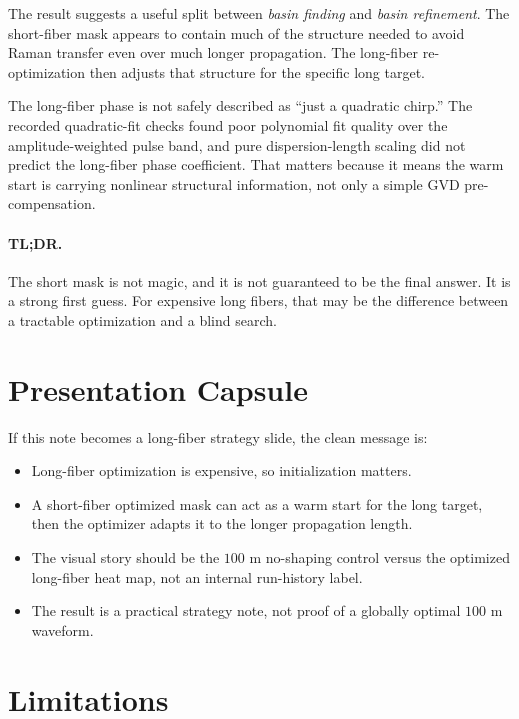 \documentclass[11pt]{article}
\begin{document}
The result suggests a useful split between \emph{basin finding} and
\emph{basin refinement}.  The short-fiber mask appears to contain much of the
structure needed to avoid Raman transfer even over much longer propagation.
The long-fiber re-optimization then adjusts that structure for the specific
long target.

The long-fiber phase is not safely described as ``just a quadratic chirp.''
The recorded quadratic-fit checks found poor polynomial fit quality over the
amplitude-weighted pulse band, and pure dispersion-length scaling did not
predict the long-fiber phase coefficient.  That matters because it means the
warm start is carrying nonlinear structural information, not only a simple GVD
pre-compensation.

\paragraph{TL;DR.}
The short mask is not magic, and it is not guaranteed to be the final answer.
It is a strong first guess.  For expensive long fibers, that may be the
difference between a tractable optimization and a blind search.

\section{Presentation Capsule}

If this note becomes a long-fiber strategy slide, the clean message is:
\begin{itemize}
\item Long-fiber optimization is expensive, so initialization matters.
\item A short-fiber optimized mask can act as a warm start for the long target, then the optimizer adapts it to the longer propagation length.
\item The visual story should be the $100$ m no-shaping control versus the optimized long-fiber heat map, not an internal run-history label.
\item The result is a practical strategy note, not proof of a globally optimal $100$ m waveform.
\end{itemize}

\section{Limitations}
\end{document}
